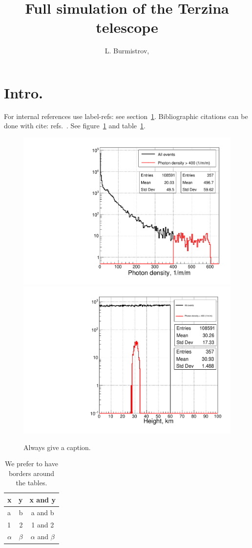 \documentclass[a4paper,11pt]{article}
\title{Full simulation of the Terzina telescope}
\author[a]{L. Burmistrov,}
\affiliation[a]{University of Geneva,\\Geneva, Switzerland}
\begin{document}
\maketitle
\flushbottom

\section{Intro.}
\label{sec:intro}

For internal references use label-refs: see section~\ref{sec:intro}.
Bibliographic citations can be done with cite: refs.~\cite{a,b,c}.
See figure~\ref{fig:i} and table~\ref{tab:i}.

\begin{figure}[tbp]
\centering %
\includegraphics[width=.45\textwidth]{./fig_pdf/photon_density_cut.pdf}
\hfill
\includegraphics[width=.45\textwidth,origin=c,angle=0]{./fig_pdf/height_cut.pdf}
\caption{\label{fig:i} Always give a caption.}
\end{figure}

\begin{table}[tbp]
\centering
\begin{tabular}{|lr|c|}
\hline
x&y&x and y\\
\hline
a & b & a and b\\
1 & 2 & 1 and 2\\
$\alpha$ & $\beta$ & $\alpha$ and $\beta$\\
\hline
\end{tabular}
\caption{\label{tab:i} We prefer to have borders around the tables.}
\end{table}
\end{document}
